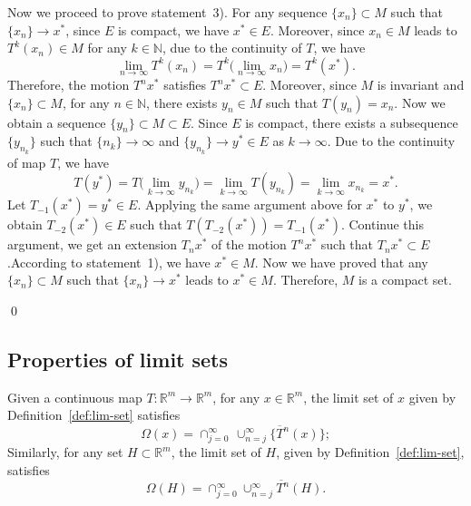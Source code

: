 \documentclass[10pt]{svmult}
\newcommand{\QED}{\begin{flushright}\qed \end{flushright}}
\begin{document}
Now we proceed to prove statement~3). For any sequence $\{x_n\}\subset M$ such that $\{x_n\}\to x^*$, since $E$ is compact, we have $x^*\in E$. Moreover, since $x_n\in M$ leads to $T^k(x_n)\in M$ for any $k\in \mathbb{N}$, due to the continuity of $T$, we have 
\begin{equation*}
\lim_{n\to \infty}T^k(x_n)=T^k\Big(\lim_{n\to \infty}x_n\Big)=T^k(x^*).
\end{equation*}
Therefore, the motion $T^n x^*$ satisfies $T^n x^* \subset E$. Moreover, since $M$ is invariant and $\{x_n\}\subset M$, for any $n\in \mathbb{N}$, there exists $y_n\in M$ such that $T(y_n)=x_n$. Now we obtain a sequence $\{y_n\}\subset M\subset E$. Since $E$ is compact, there exists a subsequence $\{y_{n_k}\}$ such that $\{n_k\}\to \infty$ and $\{y_{n_k}\}\to y^*\in E$ as $k\to \infty$. Due to the continuity of map $T$, we have
\begin{equation*}
T(y^*) = T\Big( \lim_{k\to \infty} y_{n_k} \Big) = \lim_{k\to \infty} T(y_{n_k})=\lim_{k\to \infty} x_{n_k} = x^*.
\end{equation*}
Let $T_{-1}(x^*)=y^*\in E$. Applying the same argument above for $x^*$ to $y^*$, we obtain $T_{-2}(x^*)\in E$ such that $T(T_{-2}(x^*))=T_{-1}(x^*)$. Continue this argument, we get an extension $T_n x^*$ of the motion $T^n x^*$ such that $T_n x^*\subset E$.According to statement~1), we have $x^*\in M$. Now we have proved that any $\{x_n\}\subset M$ such that $\{x_n\}\to x^*$ leads to $x^*\in M$. Therefore, $M$ is a compact set. \QED








\subsection{Properties of limit sets}

\begin{lemma}\label{lem:limit-set-closed-form}
Given a continuous map $T:\mathbb{R}^m \to \mathbb{R}^m$, for any $x\in \mathbb{R}^m$, the limit set of $x$ given by Definition~\ref{def:lim-set} satisfies
\begin{equation}\label{eq:limit-set-point-closed-form}
\Omega(x) = \cap_{j=0}^{\infty}\,\overline{\cup_{n=j}^{\infty} \{T^n(x)\}};
\end{equation}
Similarly, for any set $H\subset \mathbb{R}^m$, the limit set of $H$, given by Definition~\ref{def:lim-set}, satisfies
\begin{equation}\label{eq:limit-set-set-closed-form}
\Omega(H) = \cap_{j=0}^{\infty} \overline{\cup_{n=j}^{\infty} T^n(H)}.
\end{equation}
\end{lemma}
\end{document}
